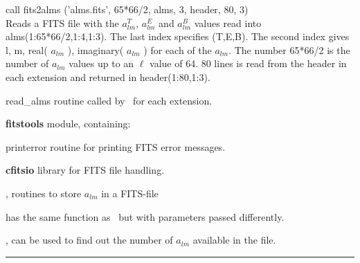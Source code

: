 \begin{example}
{
call fits2alms ('alms.fits', 65*66/2, alms, 3, header, 80, 3)  \\
}
{
Reads a FITS file with the $a_{lm}^T$, $a_{lm}^E$ and $a_{lm}^B$ values read into alms(1:65*66/2,1:4,1:3). The last index specifies (T,E,B). The second index gives l, m, real( $a_{lm}$ ), imaginary( $a_{lm}$ ) for each of the $a_{lm}$. The number 65*66/2 is the number of  $a_{lm}$  values up to an $\ell$ value of 64. 80 lines is read from the header in each extension and returned in header(1:80,1:3).
}
\end{example}

\begin{modules}
  \begin{sulist}{} %
  \item[read\_alms] routine called by \thedocid\ for each extension.
  \item[\textbf{fitstools}] module, containing:
  \item[printerror] routine for printing FITS error messages.
  \item[\textbf{cfitsio}] library for FITS file handling.		
  \end{sulist}
\end{modules}
\newpage
\begin{related}
  \begin{sulist}{} %
  \item[\htmlref{alms2fits}{sub:alms2fits}, \htmlref{dump\_alms}{sub:dump_alms}] routines to store $a_{lm}$ in a FITS-file 
  \item[\htmlref{read\_conbintab}{sub:read_conbintab}] has the same function as
  \thedocid\ but with parameters passed differently.
  \item[\htmlref{number\_of\_alms}{sub:number_of_alms}, \htmlref{getsize\_fits}{sub:getsize_fits}]
  can be used to find out the number of $a_{lm}$ available in the file.
  \end{sulist}
\end{related}

\rule{\hsize}{2mm}

\newpage
